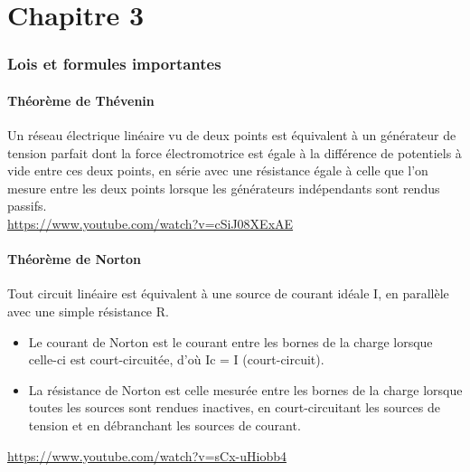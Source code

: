 \part{Chapitre 3}
 \section{Lois et formules importantes}
 \subsection{Théorème de Thévenin}
Un réseau électrique linéaire vu de deux points est équivalent à un générateur de tension parfait dont la force électromotrice est égale à la différence de potentiels à vide entre ces deux points, en série avec une résistance égale à celle que l'on mesure entre les deux points lorsque les générateurs indépendants sont rendus passifs.\\
\hyperref[Vidéo d'exemple]{https://www.youtube.com/watch?v=cSiJ08XExAE}
\subsection{Théorème de Norton}
Tout circuit linéaire est équivalent à une source de courant idéale I, en parallèle avec une simple résistance R.
\begin{itemize}
	\item Le courant de Norton est le courant entre les bornes de la charge lorsque celle-ci est court-circuitée, d'où Ic = I (court-circuit).
	\item La résistance de Norton est celle mesurée entre les bornes de la charge lorsque toutes les sources sont rendues inactives, en court-circuitant les sources de tension et en débranchant les sources de courant.\\
\end{itemize}
\hyperref[Vidéo d'exemple]{https://www.youtube.com/watch?v=sCx-uHiobb4}
